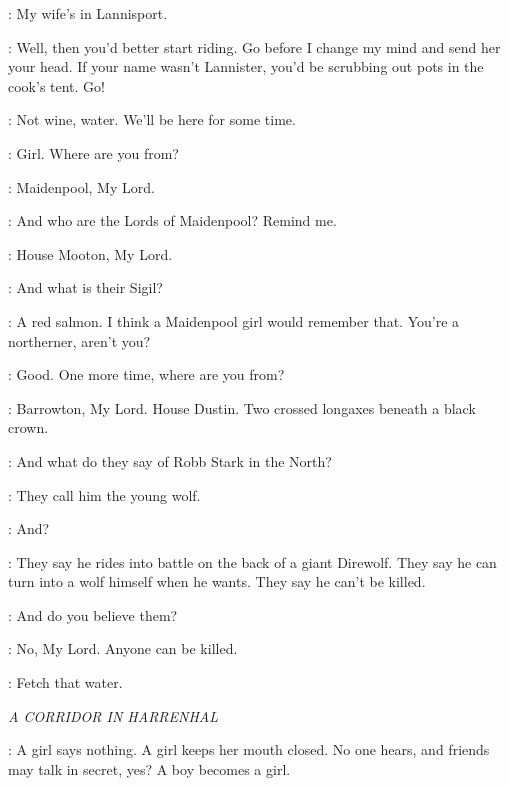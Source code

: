 \REGINALD: My wife's in Lannisport. 

\TYWIN: Well, then you'd better start riding. Go before I change my mind and send her your head. If your name wasn't Lannister, you'd be scrubbing out pots in the cook's tent. Go! 


\TYWIN: Not wine, water. We'll be here for some time. 


\TYWIN: Girl. Where are you from? 

\ARYA: Maidenpool, My Lord. 

\TYWIN: And who are the Lords of Maidenpool? Remind me. 

\ARYA: House Mooton, My Lord. 

\TYWIN: And what is their Sigil? 


\TYWIN: A red salmon. I think a Maidenpool girl would remember that. You're a northerner, aren't you? 


\TYWIN: Good. One more time, where are you from? 

\ARYA: Barrowton, My Lord. House Dustin. Two crossed longaxes beneath a black crown. 

\TYWIN: And what do they say of Robb Stark in the North? 

\ARYA: They call him the young wolf. 

\TYWIN: And? 

\ARYA: They say he rides into battle on the back of a giant Direwolf. They say he can turn into a wolf himself when he wants. They say he can't be killed. 

\TYWIN: And do you believe them? 

\ARYA: No, My Lord. Anyone can be killed. 


\TYWIN: Fetch that water. 


\scene

\textit{A CORRIDOR IN HARRENHAL} 


\JAQEN: A girl says nothing. A girl keeps her mouth closed. No one hears, and friends may talk in secret, yes? A boy becomes a girl. 


